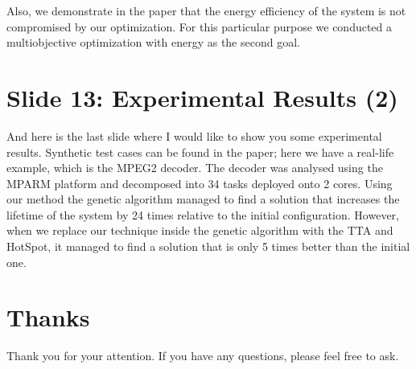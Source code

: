 \documentclass[11pt,a4paper]{article}
\begin{document}
Also, we demonstrate in the paper that the energy efficiency of the system is not compromised by our optimization. For this particular purpose we conducted a multiobjective optimization with energy as the second goal.

\section{Slide 13: Experimental Results (2)}
And here is the last slide where I would like to show you some experimental results. Synthetic test cases can be found in the paper; here we have a real-life example, which is the MPEG2 decoder. The decoder was analysed using the MPARM platform and decomposed into 34 tasks deployed onto 2 cores. Using our method the genetic algorithm managed to find a solution that increases the lifetime of the system by 24 times relative to the initial configuration. However, when we replace our technique inside the genetic algorithm with the TTA and HotSpot, it managed to find a solution that is only 5 times better than the initial one.

\section{Thanks}
Thank you for your attention. If you have any questions, please feel free to ask.
\end{document}

